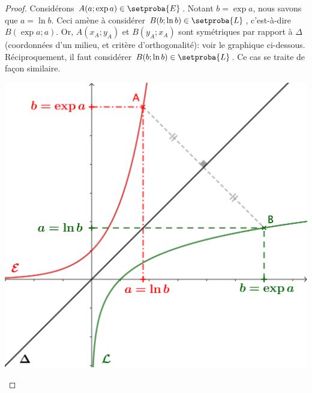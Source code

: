 \begin{proof}
	Considérons $A(a;\exp a) \in \setproba{E}$.
	Notant $b = \exp a$, nous savons que $a = \ln b$.
	Ceci amène à considérer $B(b;\ln b) \in \setproba{L}$,
	c'est-à-dire $B(\exp a;a)$.
	Or,
	$A(x_A;y_A)$ et $B(y_A;x_A)$ sont symétriques par rapport à $\Delta$
	(coordonnées d'un milieu, et critère d'orthogonalité):
	voir le graphique ci-dessous.
	Réciproquement, il faut considérer $B(b;\ln b) \in \setproba{L}$.
	Ce cas se traite de façon similaire.

	\begin{center}
		\includegraphics[scale=.85]{content/exp/graph.png}
	\end{center}
	
	\null
	\vspace{-6.5ex}
\end{proof}
